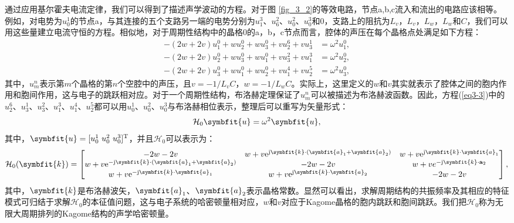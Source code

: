 通过应用基尔霍夫电流定律，我们可以得到了描述声学波动的方程。对于图 \ref{fig_3_2}的等效电路，节点a,b,c流入和流出的电路应该相等。例如，对电势为$u_0^1$的节点a，与其连接的五个支路另一端的电势分别为$u_1^3$、$u_6^2$、$u_0^2$、$u_0^3$和0，支路上的阻抗为$L_v$，$L_v$，$L_w$，$L_w$和$C$，我们可以用这些量建立电流守恒的方程。相似地，对于周期性结构中的晶格0的a，b，c节点而言，腔体的声压在每个晶格点处满足如下方程：
\begin{subequations}\label{eq3-3}
  \begin{align}
  -(2w + 2v)u_{1}^{0} + wu_{2}^{0} + wu_{3}^{0} + vu_{2}^{6} + vu_{3}^{1} &= \omega^{2}u_{1}^{0}\label{eq:sub1},\\
  -(2w + 2v)u_{2}^{0} + wu_{3}^{0} + wu_{1}^{0} + vu_{3}^{2} + vu_{1}^{3} &= \omega^{2}u_{2}^{0}\label{eq:sub2},\\
  -(2w + 2v)u_{3}^{0} + wu_{1}^{0} + wu_{2}^{0} + vu_{1}^{4} + vu_{2}^{5} &= \omega^{2}u_{3}^{0},\label{eq:sub3}
  \end{align}
\end{subequations}
其中，$u_m^n$表示第$m$个晶格的第$n$个空腔中的声压，且$v = -1/L_vC$，$w = -1/L_wC$。实际上，这里定义的$w$和$v$其实就表示了腔体之间的胞内作用和胞间作用，这与电子的跳跃相对应。对于一个周期性结构，布洛赫定理保证了$u_m^n$可以被描述为布洛赫波函数。因此，方程(\ref{eq3-3})中的$u_2^6$、$u_3^1$、$u_3^2$、$u_1^3$、$u_1^4$、$u_2^5$都可以用$u_0^1$、$u_0^2$、$u_0^3$与布洛赫相位表示，整理后可以重写为矢量形式：
\begin{equation}\label{eq3-4}
  \mathcal{H}_{0}{\symbfit{u}} = \omega^{2}\symbfit{u},
\end{equation}
其中，$\symbfit{u} = [u_0^1\ u_0^2\ u_0^3]^{\mathrm{T}}$，并且$\mathcal{H}_{0}$可以表示为：
\begin{equation}\label{eq3-5}
  \mathcal{H}_{0}{(\symbfit{k})} = 
  \begin{bmatrix}
  -2w - 2v & w + v\mathrm{e}^{\mathrm{j}\symbfit{k}\cdot(\symbfit{a}_{1}+\symbfit{a}_{2})} & w + v\mathrm{e}^{\mathrm{j}\symbfit{k}\cdot\symbfit{a}_{1}} \\
  w + v\mathrm{e}^{-\mathrm{j}{\symbfit{k}}\cdot(\symbfit{a}_{1}+\symbfit{a}_{2})} & -2w - 2v & w + ve^{-\mathrm{j}\symbfit{k}\cdot\mathbf{a}_{2}} \\
  w + v\mathrm{e}^{-\mathrm{j}\symbfit{k}\cdot\symbfit{a}_{1}} & w + v\mathrm{e}^{\mathrm{j}\symbfit{k}\cdot\symbfit{a}_{2}} & -2w - 2v
  \end{bmatrix},
\end{equation}
其中，$\symbfit{k}$是布洛赫波矢，$\symbfit{a}_{1}$、$\symbfit{a}_{2}$表示晶格常数。显然可以看出，求解周期结构的共振频率及其相应的特征模式可归结于求解$\mathcal{H}_{0}$的本征值问题，这与电子系统的哈密顿量相对应，$w$和$v$对应于Kagome晶格的胞内跳跃和胞间跳跃。我们把$\mathcal{H}_{0}$称为无限大周期排列的Kagome结构的声学哈密顿量。

